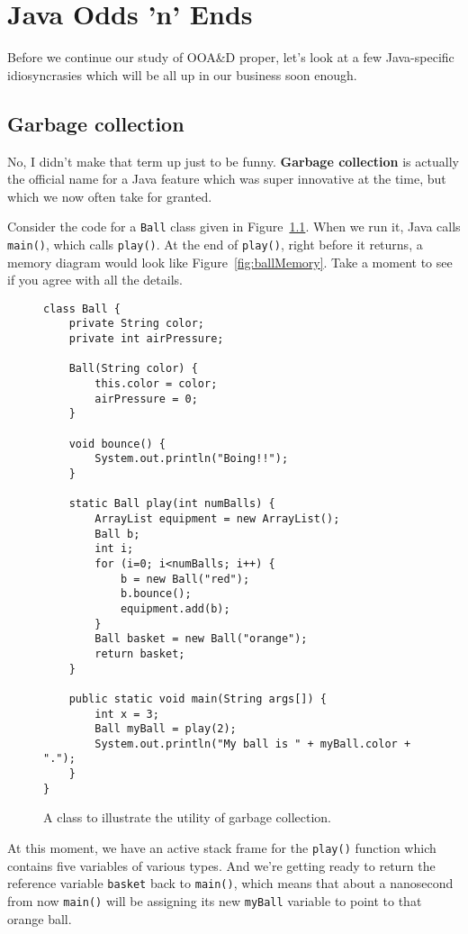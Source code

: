
\chapter{Java Odds 'n' Ends}

Before we continue our study of OOA\&D proper, let's look at a few
Java-specific idiosyncrasies which will be all up in our business soon enough.

\section{Garbage collection}

No, I didn't make that term up just to be funny. \textbf{Garbage collection}
is actually the official name for a Java feature which was super innovative at
the time, but which we now often take for granted.

Consider the code for a \texttt{Ball} class given in
Figure~\ref{fig:ballCode}. When we run it, Java calls \texttt{main()}, which
calls \texttt{play()}. At the end of \texttt{play()}, right before it returns,
a memory diagram would look like Figure~\ref{fig:ballMemory}. Take a moment to
see if you agree with all the details.

\begin{figure}[ht]
\begin{Verbatim}[fontsize=\scriptsize,samepage=true,frame=single]
class Ball {
    private String color;
    private int airPressure;

    Ball(String color) {
        this.color = color;
        airPressure = 0;
    }

    void bounce() {
        System.out.println("Boing!!");
    }

    static Ball play(int numBalls) {
        ArrayList equipment = new ArrayList();
        Ball b;
        int i;
        for (i=0; i<numBalls; i++) {
            b = new Ball("red");
            b.bounce();
            equipment.add(b);
        }
        Ball basket = new Ball("orange");
        return basket;
    }

    public static void main(String args[]) {
        int x = 3;
        Ball myBall = play(2);
        System.out.println("My ball is " + myBall.color + ".");
    }
}
\end{Verbatim}
\caption{A class to illustrate the utility of garbage collection.}
\label{fig:ballCode}
\end{figure}

At this moment, we have an active stack frame for the \texttt{play()} function
which contains five variables of various types. And we're getting ready to
return the reference variable \texttt{basket} back to \texttt{main()}, which
means that about a nanosecond from now \texttt{main()} will be assigning its
new \texttt{myBall} variable to point to that orange ball.

